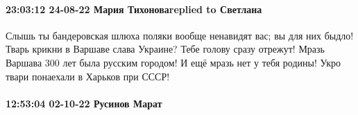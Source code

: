 
 
 
 
 

\paragraph{23:03:12 24-08-22 Мария Тихоноваreplied to Светлана}

Слышь ты бандеровская шлюха поляки вообще ненавидят вас; вы для них быдло!
Тварь крикни в Варшаве слава Украине? Тебе голову сразу отрежут! Мразь Варшава
300 лет была русским городом! И ещё мразь нет у тебя родины! Укро твари
понаехали в Харьков при СССР!







\paragraph{12:53:04 02-10-22 Русинов Марат}

